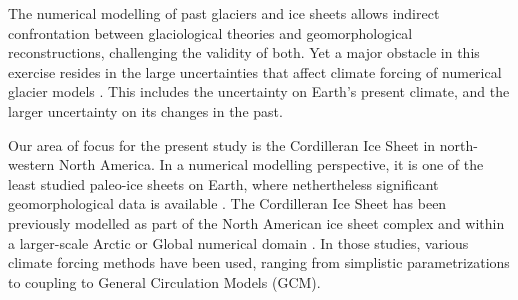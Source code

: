 
\introduction
\label{sec:intro}

The numerical modelling of past glaciers and ice sheets allows indirect confrontation between glaciological theories and geomorphological reconstructions, challenging the validity of both. Yet a major obstacle in this exercise resides in the large uncertainties that affect climate forcing of numerical glacier models \citep{hebeler-etal-2008}. This includes the uncertainty on Earth's present climate, and the larger uncertainty on its changes in the past.

Our area of focus for the present study is the Cordilleran Ice Sheet in north-western North America. In a numerical modelling perspective, it is one of the least studied paleo-ice sheets on Earth, where nethertheless significant geomorphological data is available \citep{jackson-clague-1991}.
The Cordilleran Ice Sheet has been previously modelled as part of the North American ice sheet complex \citep{marshall-clarke-1999,calov-etal-2002,tarasov-peltier-2004,bintanja-etal-2005,gregoire-etal-2012} and within a larger-scale Arctic or Global numerical domain \citep{huybrechts-tsiobbel-1996,charbit-etal-2002,johnson-fastook-2002,zweck-huybrechts-2005,abeouchi-etal-2007,charbit-etal-2013}. In those studies, various climate forcing methods have been used, ranging from simplistic parametrizations to coupling to General Circulation Models (GCM).

